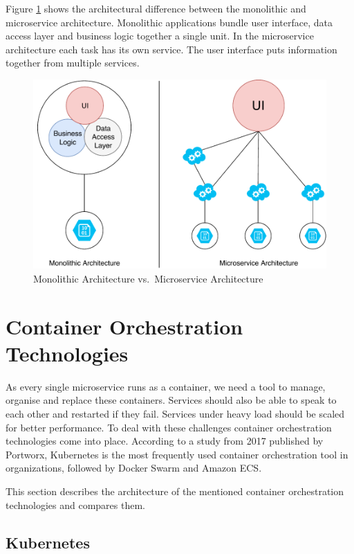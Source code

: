 Figure \ref{monolithic_vs_microservice} shows the architectural
difference between the monolithic and microservice architecture.
Monolithic applications bundle user interface, data access layer and
business logic together a single unit. In the microservice architecture
each task has its own service. The user interface puts information
together from multiple services.

\begin{figure}
\centering
\includegraphics[width=15.00000cm]{images/monolithic_vs_microservice}
\caption{Monolithic Architecture vs.~Microservice Architecture
\label{monolithic_vs_microservice}}
\end{figure}

\section{Container Orchestration
Technologies}\label{container-orchestration-technologies}

As every single microservice runs as a container, we need a tool to
manage, organise and replace these containers. Services should also be
able to speak to each other and restarted if they fail. Services under
heavy load should be scaled for better performance. To deal with these
challenges container orchestration technologies come into place.
According to a study from 2017 published by Portworx, Kubernetes is the
most frequently used container orchestration tool in organizations,
followed by Docker Swarm and Amazon ECS. \cite{portworx-2017}

This section describes the architecture of the mentioned container
orchestration technologies and compares them.

\subsection{Kubernetes}\label{kubernetes}

